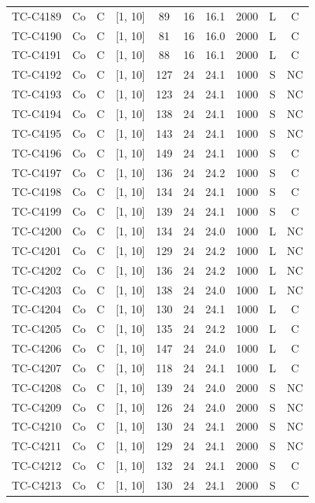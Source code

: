 \begin{longtable}{lccccccccc}
TC-C4189 & Co & C & [1, 10] & 89 & 16 & 16.1 & 2000 & L & C \\
TC-C4190 & Co & C & [1, 10] & 81 & 16 & 16.0 & 2000 & L & C \\
TC-C4191 & Co & C & [1, 10] & 88 & 16 & 16.1 & 2000 & L & C \\
TC-C4192 & Co & C & [1, 10] & 127 & 24 & 24.1 & 1000 & S & NC \\
TC-C4193 & Co & C & [1, 10] & 123 & 24 & 24.1 & 1000 & S & NC \\
TC-C4194 & Co & C & [1, 10] & 138 & 24 & 24.1 & 1000 & S & NC \\
TC-C4195 & Co & C & [1, 10] & 143 & 24 & 24.1 & 1000 & S & NC \\
TC-C4196 & Co & C & [1, 10] & 149 & 24 & 24.1 & 1000 & S & C \\
TC-C4197 & Co & C & [1, 10] & 136 & 24 & 24.2 & 1000 & S & C \\
TC-C4198 & Co & C & [1, 10] & 134 & 24 & 24.1 & 1000 & S & C \\
TC-C4199 & Co & C & [1, 10] & 139 & 24 & 24.1 & 1000 & S & C \\
TC-C4200 & Co & C & [1, 10] & 134 & 24 & 24.0 & 1000 & L & NC \\
TC-C4201 & Co & C & [1, 10] & 129 & 24 & 24.2 & 1000 & L & NC \\
TC-C4202 & Co & C & [1, 10] & 136 & 24 & 24.2 & 1000 & L & NC \\
TC-C4203 & Co & C & [1, 10] & 138 & 24 & 24.0 & 1000 & L & NC \\
TC-C4204 & Co & C & [1, 10] & 130 & 24 & 24.1 & 1000 & L & C \\
TC-C4205 & Co & C & [1, 10] & 135 & 24 & 24.2 & 1000 & L & C \\
TC-C4206 & Co & C & [1, 10] & 147 & 24 & 24.0 & 1000 & L & C \\
TC-C4207 & Co & C & [1, 10] & 118 & 24 & 24.1 & 1000 & L & C \\
TC-C4208 & Co & C & [1, 10] & 139 & 24 & 24.0 & 2000 & S & NC \\
TC-C4209 & Co & C & [1, 10] & 126 & 24 & 24.0 & 2000 & S & NC \\
TC-C4210 & Co & C & [1, 10] & 130 & 24 & 24.1 & 2000 & S & NC \\
TC-C4211 & Co & C & [1, 10] & 129 & 24 & 24.1 & 2000 & S & NC \\
TC-C4212 & Co & C & [1, 10] & 132 & 24 & 24.1 & 2000 & S & C \\
TC-C4213 & Co & C & [1, 10] & 130 & 24 & 24.1 & 2000 & S & C \\

\end{longtable}
